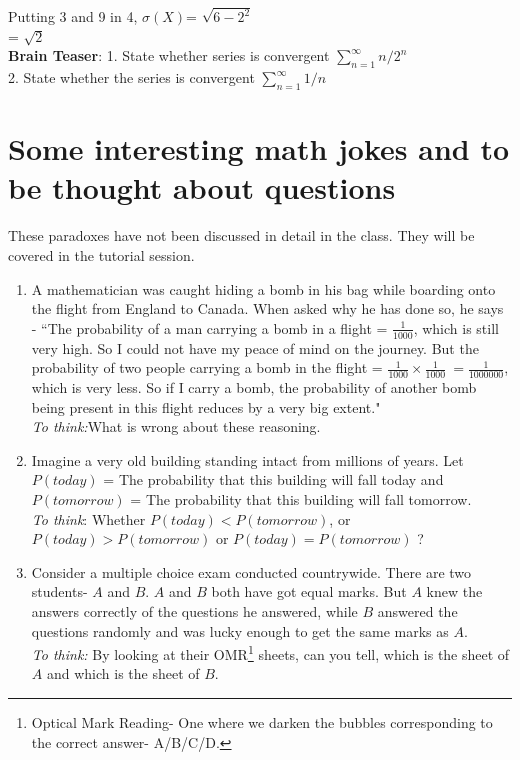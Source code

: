 \documentclass[a4paper]{article}
\begin{document}
Putting 3 and 9 in 4, $\sigma(X)$=  $ \sqrt{6- 2 ^ 2} $\\

= $\sqrt{2}$\\	
\textbf{Brain Teaser}: 1. State whether series is convergent $\sum_{n=1}^{\infty} n/2^{n} $\\
2. State whether the series is convergent $\sum_{n=1}^{\infty} 1/n$ \\


\section{Some interesting math jokes and to be thought about questions}

{\footnotesize These paradoxes have not been discussed in detail in the class. They will be covered in the tutorial session.}

\begin{enumerate}

\item A mathematician was caught hiding a bomb in his bag while boarding onto the flight from England to Canada. When asked why he has done so, he says - ``The probability of a man carrying a bomb in a flight = $\frac{1}{1000}$, which is still very high. So I could not have my peace of mind on the journey. But the probability of two people carrying a bomb in the flight = $\frac{1}{1000} \times \frac{1}{1000}\ = \frac{1}{1000000}$, which is very less. So if I carry a bomb, the probability of another bomb being present in this flight reduces by a very big extent."\\
\textit{To think:}What is wrong about these reasoning. 

\item Imagine a very old building standing intact from millions of years. Let $P(today)$ = The probability that this building will fall today and $P(tomorrow)$ = The probability that this building will fall tomorrow. \\
\textit{To think}: Whether $P(today)<P(tomorrow)$, or $P(today)>P(tomorrow)$ or $P(today)=P(tomorrow)$ ?

\item Consider a multiple choice exam conducted countrywide. There are two students- $A$ and $B$. $A$ and $B$ both have got equal marks. But $A$ knew the answers correctly of the questions he answered, while $B$ answered the questions randomly and was lucky enough to get the same marks as $A$. \\
\textit{To think:} By looking at their OMR\footnote{Optical Mark Reading- One where we darken the bubbles corresponding to the correct answer- A/B/C/D.} sheets, can you tell, which is the sheet of $A$ and which is the sheet of $B$.

\end{enumerate}
\end{document}
